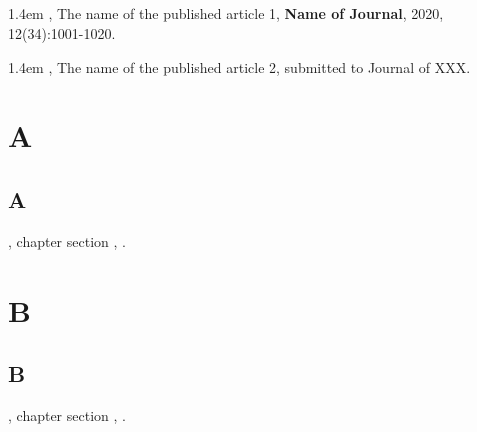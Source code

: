 \documentclass{article}
\begin{document}
\section{ }

 





\begin{researchpage}
\hangindent 1.4em
,  The name of the published article 1, {\bf  Name of Journal}, 2020, 12(34):1001-1020.

\hangindent 1.4em
, The name of the published article 2, submitted to
Journal of XXX.


\end{researchpage}

\begin{thankpage}
\chaptermark{ }
\setlength{\baselineskip}{24pt}

 

\end{thankpage}





\renewcommand{\chaptermark}[1]{\markboth{#1}{}}

\chapter{  A ~  }
\renewcommand{\thesection}{A.\arabic{section}}
\section{ A }

 ,   chapter   section  ,  .

\chapter{  B ~  }
\renewcommand{\thesection}{B.\arabic{section}}
\section{ B }

 ,   chapter   section  ,  .
\end{document}
